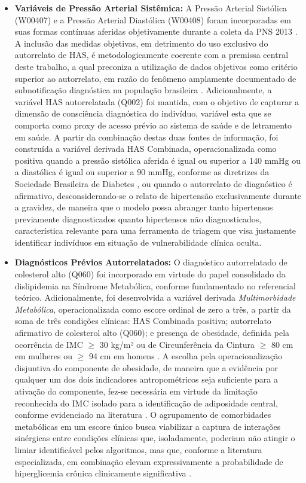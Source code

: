 \begin{itemize}
\item[] \textbf{Variáveis de Pressão Arterial Sistêmica: }
A Pressão Arterial Sistólica (W00407) e a Pressão Arterial Diastólica (W00408) foram incorporadas em suas formas contínuas aferidas objetivamente durante a coleta da PNS 2013 \cite{ibge2013pns}. A inclusão das medidas objetivas, em detrimento do uso exclusivo do autorrelato de HAS, é metodologicamente coerente com a premissa central deste trabalho, a qual preconiza a utilização de dados objetivos como critério superior ao autorrelato, em razão do fenômeno amplamente documentado de subnotificação diagnóstica na população brasileira \cite{muzy2021prevalencia,reis2022evolution,deAlmeida-Pititto09112015}.
 Adicionalmente, a variável HAS autorrelatada (Q002) foi mantida, com o objetivo de capturar a dimensão de consciência diagnóstica do indivíduo, variável esta que se comporta como proxy de acesso prévio ao sistema de saúde e de letramento em saúde. A partir da combinação destas duas fontes de informação, foi construída a variável derivada HAS Combinada, operacionalizada como positiva quando a pressão sistólica aferida é igual ou superior a 140 mmHg ou a diastólica é igual ou superior a 90 mmHg, conforme as diretrizes da Sociedade Brasileira de Diabetes \cite{SBD2019}, ou quando o autorrelato de diagnóstico é afirmativo, desconsiderando-se o relato de hipertensão exclusivamente durante a gravidez, de maneira que o modelo possa abranger tanto hipertensos previamente diagnosticados quanto hipertensos não diagnosticados, característica relevante para uma ferramenta de triagem que visa justamente identificar indivíduos em situação de vulnerabilidade clínica oculta.

\item[] \textbf{Diagnósticos Prévios Autorrelatados: }
O diagnóstico autorrelatado de colesterol alto (Q060) foi incorporado em virtude do papel consolidado da dislipidemia na Síndrome Metabólica, conforme fundamentado no referencial teórico.
Adicionalmente, foi desenvolvida a variável derivada \textit{Multimorbidade Metabólica}, operacionalizada como escore ordinal de zero a três, a partir da soma de três condições clínicas: HAS Combinada positiva; autorrelato afirmativo de colesterol alto (Q060); e presença de obesidade, definida pela ocorrência de IMC $\geq$ 30 kg/m² ou de Circunferência da Cintura $\geq$ 80 cm em mulheres ou $\geq$ 94 cm em homens \cite{SBD2019}. 
A escolha pela operacionalização disjuntiva do componente de obesidade, de maneira que a evidência por qualquer um dos dois indicadores antropométricos seja suficiente para a ativação do componente, fez-se necessária em virtude da limitação reconhecida do IMC isolado para a identificação de adiposidade central, conforme evidenciado na literatura \cite{Feller2010}.
O agrupamento de comorbidades metabólicas em um escore único busca viabilizar a captura de interações sinérgicas entre condições clínicas que, isoladamente, poderiam não atingir o limiar identificável pelos algoritmos, mas que, conforme a literatura especializada, em combinação elevam expressivamente a probabilidade de hiperglicemia crônica clinicamente significativa \cite{SBD2019,rzewuska2017epidemiology}.


\end{itemize}
